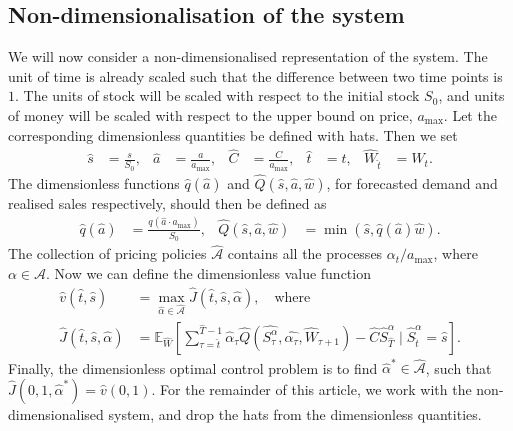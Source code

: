 \documentclass[main.tex]{subfiles}
\begin{document}
\subsection{Non-dimensionalisation of the system}
We will now consider a non-dimensionalised
representation of the system.
The unit of time is already scaled such that
the difference between two time points is $1$.
The units of stock will be  scaled with
respect to
the initial stock $S_0$, and units of money will be scaled with respect to
the upper bound on
price, $a_{\mathrm{max}}$.
Let the corresponding dimensionless quantities be defined with hats.
Then we set
\begin{align}
  \hat s
  &= \frac{s}{S_0},
  &\hat a
  &=\frac{a}{a_{\mathrm{max}}},
  &\hat C&=\frac{C}{a_{\mathrm{max}}},
  &\hat t &= t,
  &\hat W_{\hat t}&=W_{t}.
\end{align}
The dimensionless functions $\hat q(\hat a)$ and $\hat Q(\hat s,\hat
a, \hat w)$,
for forecasted demand
and realised sales respectively, should then be defined as
\begin{align}
  \hat q(\hat a)&= \frac{q(\hat a\cdot a_{\max})}{S_0},
  &\hat Q(\hat s,\hat a, \hat w)&= \min(\hat s, \hat q(\hat a)\hat w).
\end{align}
The collection of pricing policies $\hat{\mathcal A}$ contains all
the processes $\alpha_t/a_{\mathrm{max}}$, where $\alpha\in \mathcal
A$. Now we can define the dimensionless value function
\begin{align}\label{eq:value_function_def_nondim}
  \hat v(\hat t,\hat s)&=\max_{\hat \alpha\in\hat{\mathcal A}}
                    \hat J(\hat t,\hat s,\hat \alpha),\quad\text{where}\\
  \hat J(\hat t,\hat s,\hat \alpha)&=
                 \mathbb E_{\hat W}\left[ \sum_{\tau=\hat t}^{\hat T-1}
                 \hat \alpha_\tau\hat Q(\hat
                                     {S_\tau^\alpha},\hat{\alpha_\tau},\hat
                                     W_{\tau+1})
                 - \hat C \hat{S}_{\hat{T}}^\alpha \mid \hat{S}_{\hat{t}}^\alpha =
                                \hat s
                 \right].
                 \label{eq:value_function_def_nondim2}
\end{align}
Finally, the dimensionless optimal control problem
is to find $\hat \alpha^*\in\hat{\mathcal A}$, such that
$\hat J(0,1,\hat \alpha^*)=\hat v(0,1)$.
For the remainder of this article, we work with the
non-dimensionalised system, and drop the hats from the
dimensionless quantities.
\end{document}
